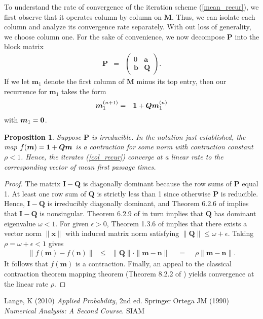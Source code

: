 \documentclass[11pt]{article}
\newtheorem{proposition}{Proposition}[section]
\def\amp{\mathop{\;\:}\nolimits}
\newcommand{\ba}{\boldsymbol{a}}
\newcommand{\bb}{\boldsymbol{b}}
\newcommand{\bm}{\boldsymbol{m}}
\newcommand{\bn}{\boldsymbol{n}}
\newcommand{\bx}{\boldsymbol{x}}
\newcommand{\bI}{\boldsymbol{I}}
\newcommand{\bM}{\boldsymbol{M}}
\newcommand{\bP}{\boldsymbol{P}}
\newcommand{\bQ}{\boldsymbol{Q}}
\begin{document}
To understand the rate of convergence of the iteration scheme (\ref{mean_recur}),
we first observe that it operates column by column on $\bM$. Thus, we can isolate each
column and analyze its convergence rate separately. With out loss of generality, we choose column one. For the sake of convenience, we now decompose $\bP$ into the block matrix 
\begin{eqnarray*}
\bP & = & \begin{pmatrix} 0 & \ba \\
\bb & \bQ \end{pmatrix}.
\end{eqnarray*}
If we let $\bm_1$ denote the first column of $\bM$ minus its top
entry, then our recurrence for $\bm_1$ takes the form
\begin{eqnarray}
\bm_1^{(n+1)} & = & {\bf 1} + \bQ \bm_1^{(n)} \label{col_recur}
\end{eqnarray} 
with $\bm_1 = {\bf 0}$.
\begin{proposition}
Suppose $\bP$ is irreducible. In the notation just established, 
the map $f(\bm) = {\bf 1} + \bQ \bm$ is a contraction for some
norm with contraction constant $\rho <1$. Hence, the iterates (\ref{col_recur})
converge at a linear rate to the corresponding vector of mean first passage times. 
\end{proposition}
\begin{proof} The matrix $\bI-\bQ$ is diagonally dominant because the row sums
of $\bP$ equal 1. At least one row sum of $\bQ$ is strictly less than 1 since
otherwise $\bP$ is reducible. Hence, $\bI-\bQ$ is irreducibly diagonally dominant, and
Theorem 6.2.6 of \cite{ortega90} implies that $\bI-\bQ$ is nonsingular. Theorem
6.2.9 of \cite{ortega90} in turn implies that $\bQ$ has dominant eigenvalue $\omega<1$.
For given $\epsilon>0$, Theorem 1.3.6 of \cite{ortega90} implies that there exists a 
vector norm $\|\bx\|$ with induced matrix norm satisfying $\|\bQ\| \le \omega+\epsilon$. Taking $\rho = \omega + \epsilon < 1$ gives
\begin{eqnarray*}
\|f(\bm)-f(\bn)\| & \le & \|\bQ\| \cdot \|\bm-\bn\| \amp = \amp \rho\|\bm-\bn\|. 
\end{eqnarray*}
It follows that $f(\bm)$ is a contraction.  Finally, an appeal to the classical contraction theorem mapping theorem (Theorem 8.2.2 of \cite{ortega90}) yields convergence at the linear rate $\rho$. 
\end{proof}


\begin{thebibliography}{99}
Lange, K (2010) {\it Applied Probability}, 2nd ed. Springer
Ortega JM (1990) {\it Numerical Analysis: A Second Course}. SIAM
\end{thebibliography}
\end{document}
